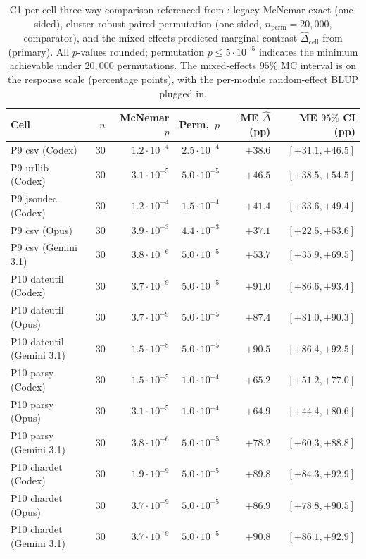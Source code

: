 \begin{table}[h]
\centering
\caption{C1 per-cell three-way comparison referenced from : legacy McNemar exact (one-sided), cluster-robust paired permutation (one-sided, $n_{\text{perm}}=20{,}000$, comparator), and the mixed-effects predicted marginal contrast $\widehat{\Delta}_{\text{cell}}$ from  (primary). All $p$-values rounded; permutation $p \le 5 \cdot 10^{-5}$ indicates the minimum achievable under $20{,}000$ permutations. The mixed-effects $95\%$ MC interval is on the response scale (percentage points), with the per-module random-effect BLUP plugged in.}
\label{tab:me-per-cell}
\small
\begin{tabular}{@{}lrrrrr@{}}
\toprule
Cell & $n$ & McNemar $p$ & Perm.\ $p$ & ME $\widehat{\Delta}$ (pp) & ME $95\%$ CI (pp) \\
\midrule
P9 csv (Codex)            & $30$ & $1.2 \cdot 10^{-4}$ & $2.5 \cdot 10^{-4}$ & $+38.6$ & $[+31.1, +46.5]$ \\
P9 urllib (Codex)         & $30$ & $3.1 \cdot 10^{-5}$ & $5.0 \cdot 10^{-5}$ & $+46.5$ & $[+38.5, +54.5]$ \\
P9 jsondec (Codex)        & $30$ & $1.2 \cdot 10^{-4}$ & $1.5 \cdot 10^{-4}$ & $+41.4$ & $[+33.6, +49.4]$ \\
P9 csv (Opus)             & $30$ & $3.9 \cdot 10^{-3}$ & $4.4 \cdot 10^{-3}$ & $+37.1$ & $[+22.5, +53.6]$ \\
P9 csv (Gemini 3.1)       & $30$ & $3.8 \cdot 10^{-6}$ & $5.0 \cdot 10^{-5}$ & $+53.7$ & $[+35.9, +69.5]$ \\
P10 dateutil (Codex)      & $30$ & $3.7 \cdot 10^{-9}$ & $5.0 \cdot 10^{-5}$ & $+91.0$ & $[+86.6, +93.4]$ \\
P10 dateutil (Opus)       & $30$ & $3.7 \cdot 10^{-9}$ & $5.0 \cdot 10^{-5}$ & $+87.4$ & $[+81.0, +90.3]$ \\
P10 dateutil (Gemini 3.1) & $30$ & $1.5 \cdot 10^{-8}$ & $5.0 \cdot 10^{-5}$ & $+90.5$ & $[+86.4, +92.5]$ \\
P10 parsy (Codex)         & $30$ & $1.5 \cdot 10^{-5}$ & $1.0 \cdot 10^{-4}$ & $+65.2$ & $[+51.2, +77.0]$ \\
P10 parsy (Opus)          & $30$ & $3.1 \cdot 10^{-5}$ & $1.0 \cdot 10^{-4}$ & $+64.9$ & $[+44.4, +80.6]$ \\
P10 parsy (Gemini 3.1)    & $30$ & $3.8 \cdot 10^{-6}$ & $5.0 \cdot 10^{-5}$ & $+78.2$ & $[+60.3, +88.8]$ \\
P10 chardet (Codex)       & $30$ & $1.9 \cdot 10^{-9}$ & $5.0 \cdot 10^{-5}$ & $+89.8$ & $[+84.3, +92.9]$ \\
P10 chardet (Opus)        & $30$ & $3.7 \cdot 10^{-9}$ & $5.0 \cdot 10^{-5}$ & $+86.9$ & $[+78.8, +90.5]$ \\
P10 chardet (Gemini 3.1)  & $30$ & $3.7 \cdot 10^{-9}$ & $5.0 \cdot 10^{-5}$ & $+90.8$ & $[+86.1, +92.9]$ \\
\bottomrule
\end{tabular}
\end{table}
